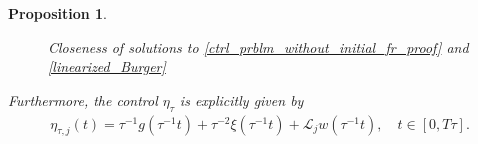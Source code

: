 \documentclass[10pt, reqno]{amsart}
\newtheorem{proposition}{Proposition} [section]
\numberwithin{equation}{section}
\begin{document}
\begin{proposition}
\begin{figure}[h!]
		\caption{Closeness of solutions to \eqref{ctrl_prblm_without_initial_fr_proof} and \eqref{linearized_Burger}}
		\label{closeness_fig}
	\end{figure}
	
	Furthermore, the control \( \eta_\tau \) is explicitly given by  
	\begin{align}\label{form_ctrl_as_solun_linear_equn}
		\eta_{\tau, j}(t) = \tau^{-1} g(\tau^{-1} t) + \tau^{-2} \xi(\tau^{-1} t) + \mathcal{L}_j w(\tau^{-1} t), \quad t \in [0, T\tau].
	\end{align}
	
\end{proposition}
\end{document}
